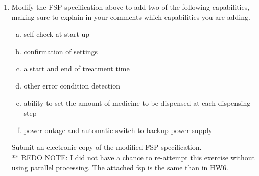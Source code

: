 \documentclass{article}
\begin{document}
\begin{enumerate}[1.]
 \item Modify the FSP specification above to add two of the following capabilities, making sure
 to explain in your comments which capabilities you are adding.
 \begin{enumerate}[a.]
    \item self-check at start-up
    \item confirmation of settings
    \item a start and end of treatment time
    \item other error condition detection
    \item ability to set the amount of medicine to be dispensed at each dispensing step
    \item power outage and automatic switch to backup power supply
    \end{enumerate}
 Submit an electronic copy of the modified FSP specification. \\

 ** REDO NOTE: I did not have a chance to re-attempt this exercise without using parallel processing. The attached fsp is the same than in HW6.\\
\end{enumerate}

\clearpage
\end{document}
